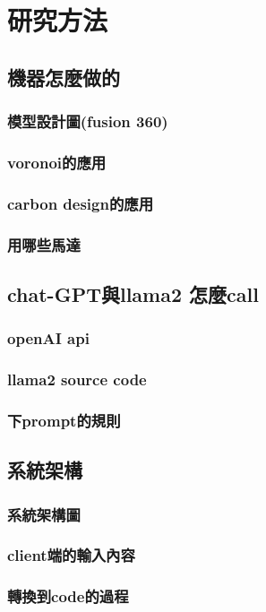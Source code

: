 \documentclass[class=NCU_thesis, crop=false]{standalone}
\begin{document}
\chapter{研究方法}

\section{機器怎麼做的}
\subsection{模型設計圖(fusion 360)}
\subsection{voronoi的應用}
\subsection{carbon design的應用}
\subsection{用哪些馬達}

\section{chat-GPT與llama2 怎麼call}
\subsection{openAI api}
\subsection{llama2 source code}
\subsection{下prompt的規則}

\section{系統架構}
\subsection{系統架構圖}
\subsection{client端的輸入內容}
\subsection{轉換到code的過程}
\end{document}
